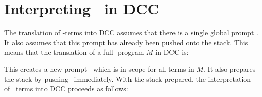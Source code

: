 \section{Interpreting \lmu\ in DCC}



The translation of \lmu-terms into DCC assumes that there is a single global prompt \gp. 
It also assumes that this prompt has already been pushed onto the stack.
This means that the translation of a full \lmu-program $M$ in DCC is:

This creates a new prompt \gp\ which is in scope for all terms in $M$.
It also prepares the stack by pushing \gp\ immediately. 
With the stack prepared, 
the interpretation of \lmu\ terms into DCC proceeds as follows:


